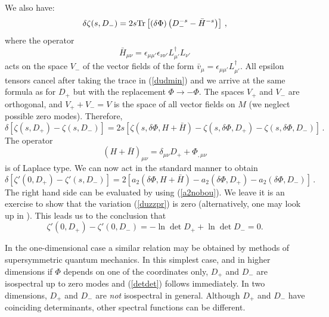 We also have:
\begin{equation}
\delta \zeta (s,D_-)=2s {\rm Tr}\left[ (\delta\Phi) \left(
D_-^{-s} - \bar H^{-s} \right) \right] \,,\label{dudmin}
\end{equation}
where the operator
\begin{equation}
\bar H_{\mu\nu}=\epsilon_{\mu\mu'}\epsilon_{\nu\nu'} L_{\mu'}^\dag
L_{\nu'} \label{defbarH}
\end{equation}
acts on the space $V_-$ of the vector fields of the form $\bar v_{\mu}=
\epsilon_{\mu\mu'}L_{\mu'}^\dag$. All epsilon tensors cancel after
taking the trace in (\ref{dudmin}) and we arrive at the same formula
as for $D_+$ but with the replacement $\Phi\to -\Phi$. The spaces
$V_+$ and $V_-$ are orthogonal, and $V_+ + V_-=V$ is the space of
all vector fields on $M$ (we neglect possible zero modes). Therefore,
\begin{equation}
\delta \left[ \zeta (s,D_+)-\zeta (s,D_-) \right]
=2s \left[ \zeta (s,\delta\Phi,H+\bar H )-
\zeta (s,\delta\Phi,D_+) -\zeta (s,\delta\Phi,D_-) \right]\,.
\label{duzz}
\end{equation}
The operator
\begin{equation}
(H+\bar H)_{\mu\nu}=\delta_{\mu\nu} D_+ +\Phi_{,\mu\nu}
\label{HbarH}
\end{equation}
is of Laplace type. We can now act in the standard manner to
obtain
\begin{equation}
\delta \left[ \zeta' (0,D_+)-\zeta' (s,D_-) \right]
=2\left[ a_2(\delta\Phi,H+\bar H )-
a_2(\delta\Phi,D_+) -a_2(\delta\Phi,D_-) \right]\,.
\label{duzzpr}
\end{equation}
The right hand side can be evaluated by using (\ref{a2nobou}).
We leave it is an exercise to show that the variation (\ref{duzzpr})
is zero (alternatively, one may look up in \cite{Vassilevich:2000kt}).  
This leads us to the conclusion that
\begin{equation}
\zeta'(0,D_+) -\zeta'(0,D_-)=-\ln\det D_+ +\ln \det D_-=0.
\label{detdet}
\end{equation}

In the one-dimensional case a similar relation may be obtained by 
methods of supersymmetric quantum mechanics. In this simplest case,
and in higher dimensions if $\Phi$ depends on one of the coordinates only,
$D_+$ and $D_-$ are isospectral up to zero modes and (\ref{detdet})
follows immediately. In two dimensions, $D_+$ and $D_-$ are
{\it not} isospectral in general. Although $D_+$ and $D_-$ have
coinciding determinants, other spectral functions can be different.

